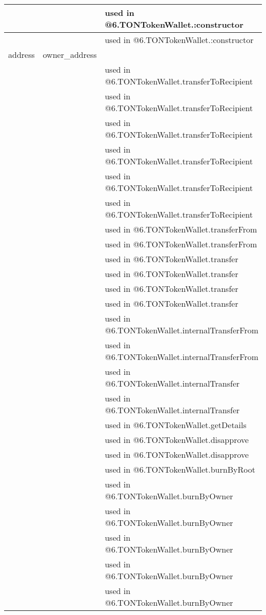 \begin{tabular}{|l|l|p{5cm}|}
 & & used in @6.TONTokenWallet.:constructor\\\hline
 & & used in @6.TONTokenWallet.:constructor\\\hline
address & owner\_{}address &  \\\hline
 & & used in @6.TONTokenWallet.transferToRecipient\\\hline
 & & used in @6.TONTokenWallet.transferToRecipient\\\hline
 & & used in @6.TONTokenWallet.transferToRecipient\\\hline
 & & used in @6.TONTokenWallet.transferToRecipient\\\hline
 & & used in @6.TONTokenWallet.transferToRecipient\\\hline
 & & used in @6.TONTokenWallet.transferToRecipient\\\hline
 & & used in @6.TONTokenWallet.transferFrom\\\hline
 & & used in @6.TONTokenWallet.transferFrom\\\hline
 & & used in @6.TONTokenWallet.transfer\\\hline
 & & used in @6.TONTokenWallet.transfer\\\hline
 & & used in @6.TONTokenWallet.transfer\\\hline
 & & used in @6.TONTokenWallet.transfer\\\hline
 & & used in @6.TONTokenWallet.internalTransferFrom\\\hline
 & & used in @6.TONTokenWallet.internalTransferFrom\\\hline
 & & used in @6.TONTokenWallet.internalTransfer\\\hline
 & & used in @6.TONTokenWallet.internalTransfer\\\hline
 & & used in @6.TONTokenWallet.getDetails\\\hline
 & & used in @6.TONTokenWallet.disapprove\\\hline
 & & used in @6.TONTokenWallet.disapprove\\\hline
 & & used in @6.TONTokenWallet.burnByRoot\\\hline
 & & used in @6.TONTokenWallet.burnByOwner\\\hline
 & & used in @6.TONTokenWallet.burnByOwner\\\hline
 & & used in @6.TONTokenWallet.burnByOwner\\\hline
 & & used in @6.TONTokenWallet.burnByOwner\\\hline
 & & used in @6.TONTokenWallet.burnByOwner\\\hline

\end{tabular}
